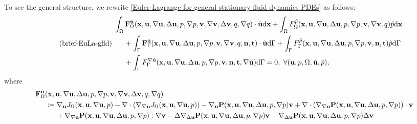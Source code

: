 \documentclass[oneside]{book}
\numberwithin{equation}{section}
\begin{document}
\begin{itemize}[leftmargin=0in]
    To see the general structure, we rewrite \eqref{Euler-Lagrange for general stationary fluid dynamics PDEs} as follows:
    \begin{equation}
        \label{brief Euler-Lagrange for general stationary fluid dynamics PDEs}
        \tag{brief-EuLa-gfld}
        \left.\begin{split}
            &\int_\Omega {\bf F}_\Omega^{\tilde{\bf u}}({\bf x},{\bf u},\nabla{\bf u},\Delta{\bf u},p,\nabla p,{\bf v},\nabla{\bf v},\Delta{\bf v},q,\nabla q)\cdot\tilde{\bf u}{\rm d}{\bf x} + \int_\Omega F_\Omega^{\tilde{p}}({\bf x},{\bf u},\nabla{\bf u},\Delta{\bf u},p,\nabla p,{\bf v},\nabla{\bf v},q)\tilde{p}{\rm d}{\bf x}\\
            &\hspace{5mm}+ \int_\Gamma {\bf F}_\Gamma^{\tilde{\bf u}}({\bf x},{\bf u},\nabla{\bf u},\Delta{\bf u},p,\nabla p,{\bf v},\nabla{\bf v},q,{\bf n},{\bf t})\cdot\tilde{\bf u}{\rm d}\Gamma + \int_\Gamma F_\Gamma^{\tilde{p}}({\bf x},{\bf u},\nabla{\bf u},\Delta{\bf u},p,\nabla p,{\bf v},{\bf n},{\bf t})\tilde{p}{\rm d}\Gamma\\
            &\hspace{5mm}+ \int_\Gamma F_\Gamma^{\nabla\tilde{\bf u}}({\bf x},{\bf u},\nabla{\bf u},\Delta{\bf u},p,\nabla p,{\bf v},{\bf n},{\bf t},\nabla\tilde{\bf u}){\rm d}\Gamma = 0,\ \forall({\bf u},p,\Omega,\tilde{\bf u},\tilde{p}),
        \end{split}\right.
    \end{equation}
    where
    \begin{align*}
        &{\bf F}_\Omega^{\tilde{\bf u}}({\bf x},{\bf u},\nabla{\bf u},\Delta{\bf u},p,\nabla p,{\bf v},\nabla{\bf v},\Delta{\bf v},q,\nabla q)\\
        &\hspace{5mm}\coloneqq\nabla_{\bf u}J_\Omega({\bf x},{\bf u},\nabla{\bf u},p) - \nabla\cdot\left(\nabla_{\nabla{\bf u}}J_\Omega({\bf x},{\bf u},\nabla{\bf u},p)\right) - \nabla_{\bf u}{\bf P}({\bf x},{\bf u},\nabla{\bf u},\Delta{\bf u},p,\nabla p){\bf v} + \nabla\cdot\left(\nabla_{\nabla{\bf u}}{\bf P}({\bf x},{\bf u},\nabla{\bf u},\Delta{\bf u},p,\nabla p)\right)\cdot{\bf v}\\
        &\hspace{1cm}+ \nabla_{\nabla{\bf u}}{\bf P}({\bf x},{\bf u},\nabla{\bf u},\Delta{\bf u},p,\nabla p):\nabla{\bf v} - \Delta\nabla_{\Delta{\bf u}}{\bf P}({\bf x},{\bf u},\nabla{\bf u},\Delta{\bf u},p,\nabla p){\bf v} - \nabla_{\Delta{\bf u}}{\bf P}({\bf x},{\bf u},\nabla{\bf u},\Delta{\bf u},p,\nabla p)\Delta{\bf v}\\

\end{align*}
\end{itemize}
\end{document}
